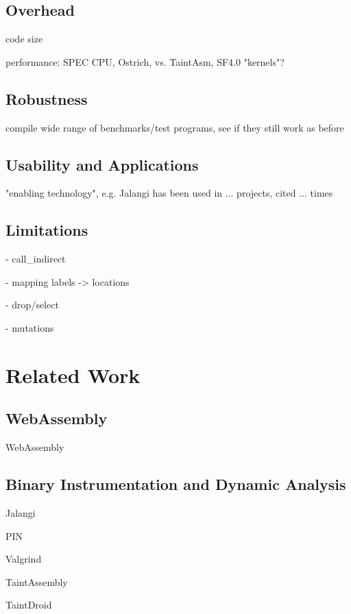 \documentclass[sigplan,review,anonymous]{acmart}\settopmatter{printfolios=true,printccs=false,printacmref=false}
\begin{document}
\subsection{Overhead}
code size

performance: SPEC CPU, Ostrich, vs. TaintAsm, SF4.0 "kernels"?

\subsection{Robustness}
compile wide range of benchmarks/test programs, see if they still work as before

\subsection{Usability and Applications}

"enabling technology", e.g. Jalangi has been used in ... projects, cited ... times

\subsection{Limitations}
- call\_indirect

- mapping labels -> locations

- drop/select

- mutations

\newpage
\section{Related Work}

\subsection{WebAssembly}

WebAssembly \cite{Haas:2017:BWU:3062341.3062363}

\subsection{Binary Instrumentation and Dynamic Analysis}

Jalangi \cite{Sen:2013:JSR:2491411.2491447}

PIN \cite{Luk:2005:PBC:1065010.1065034}

Valgrind \cite{Nethercote:2007:VFH:1250734.1250746}

TaintAssembly \cite{2018arXiv180201050F}

TaintDroid \cite{Enck:2014:TIT:2642648.2619091}


\end{document}
